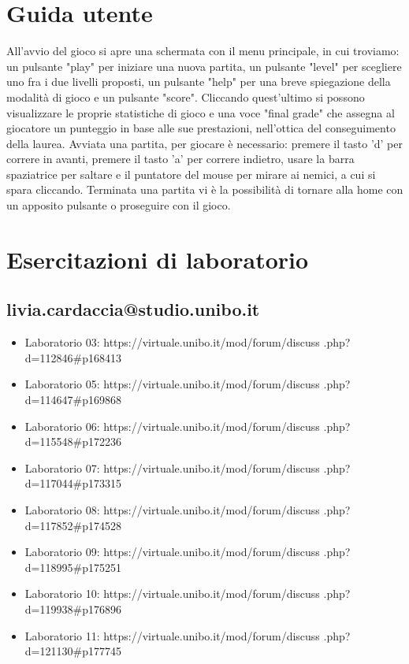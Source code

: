 \documentclass{article}
\begin{document}
\newpage
\section{Guida utente}
All'avvio del gioco si apre una schermata con il menu principale, in cui troviamo: un pulsante "play" per iniziare una nuova partita, un pulsante "level" per scegliere uno fra i due livelli proposti, un pulsante "help" per una breve spiegazione della modalità di gioco e un pulsante "score".
Cliccando quest'ultimo si possono visualizzare le proprie statistiche di gioco e una voce "final grade" che assegna al giocatore un punteggio in base alle sue prestazioni, nell'ottica del conseguimento della laurea.
Avviata una partita, per giocare è necessario: premere il tasto 'd' per correre in avanti, premere il tasto 'a' per correre indietro, usare la barra spaziatrice per saltare e il puntatore del mouse per mirare ai nemici, a cui si spara cliccando.
Terminata una partita vi è la possibilità di tornare alla home con un apposito pulsante o proseguire con il gioco.
\section{Esercitazioni di laboratorio}
\subsection{livia.cardaccia@studio.unibo.it}
\begin{itemize}
\item Laboratorio 03: https://virtuale.unibo.it/mod/forum/discuss
.php?d=112846\#p168413
\item Laboratorio 05: https://virtuale.unibo.it/mod/forum/discuss
.php?d=114647\#p169868
\item Laboratorio 06: https://virtuale.unibo.it/mod/forum/discuss
.php?d=115548\#p172236
\item Laboratorio 07: https://virtuale.unibo.it/mod/forum/discuss
.php?d=117044\#p173315
\item Laboratorio 08: https://virtuale.unibo.it/mod/forum/discuss
.php?d=117852\#p174528
\item Laboratorio 09: https://virtuale.unibo.it/mod/forum/discuss
.php?d=118995\#p175251
\item Laboratorio 10:
https://virtuale.unibo.it/mod/forum/discuss
.php?d=119938\#p176896
\item Laboratorio 11: https://virtuale.unibo.it/mod/forum/discuss
.php?d=121130\#p177745
\end{itemize}
\end{document}
